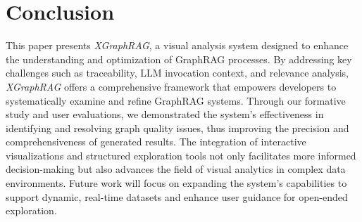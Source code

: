 \section{Conclusion}

This paper presents \textit{XGraphRAG}, a visual analysis system designed to enhance the understanding and optimization of GraphRAG processes. By addressing key challenges such as traceability, LLM invocation context, and relevance analysis, \textit{XGraphRAG} offers a comprehensive framework that empowers developers to systematically examine and refine GraphRAG systems. Through our formative study and user evaluations, we demonstrated the system's effectiveness in identifying and resolving graph quality issues, thus improving the precision and comprehensiveness of generated results. The integration of interactive visualizations and structured exploration tools not only facilitates more informed decision-making but also advances the field of visual analytics in complex data environments. Future work will focus on expanding the system's capabilities to support dynamic, real-time datasets and enhance user guidance for open-ended exploration.